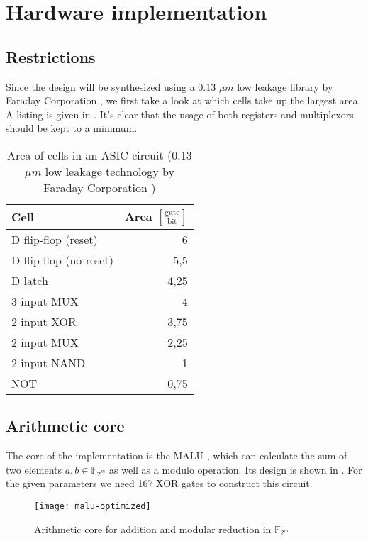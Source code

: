 \section{Hardware implementation\label{section-hardware}}

\subsection{Restrictions}

Since the design will be synthesized using a 0.13 $\mu m$ low leakage library by Faraday Corporation \cite{cell-databook}, we first take a look at which cells take up the largest area. A listing is given in . It's clear that the usage of both registers and multiplexors should be kept to a minimum.

\begin{table}[h]
	\caption[Area of cells in an ASIC circuit]{Area of cells in an ASIC circuit (0.13 $\mu m$ low leakage technology by Faraday Corporation \cite{cell-databook})}
	\label{table-cells}

	\centering
	\begin{tabular}{lr}
		\toprule
		Cell							& Area $\left[\frac{\text{gate}}{\text{bit}}\right]$\\
		\midrule
		D flip-flop (reset)		& 6\\
		D flip-flop (no reset)	& 5,5\\
		D latch						& 4,25\\
		3 input MUX					& 4\\
		2 input XOR					& 3,75\\
		2 input MUX					& 2,25\\
		2 input NAND				& 1\\
		NOT							& 0,75\\
		\bottomrule
	\end{tabular}
\end{table}

\subsection{Arithmetic core}

The core of the implementation is the MALU \cite{sakiyama, batina-pkc}, which can calculate the sum of two elements $a, b \in \mathbb{F}_{2^m}$ as well as a modulo operation. Its design is shown in . For the given parameters we need 167 XOR gates to construct this circuit.

\begin{figure}[h]
	\centering
		\texttt{[image: malu-optimized]}
		\caption{Arithmetic core for addition and modular reduction in $\mathbb{F}_{2^m}$\label{figure-malu}}
\end{figure}

